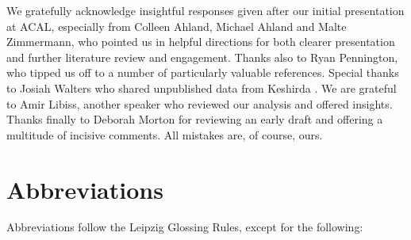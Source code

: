 \documentclass[output=paper,modfonts]{langscibook}
\begin{document}
We gratefully acknowledge insightful responses given after our initial presentation at ACAL, especially from Colleen Ahland, Michael Ahland and Malte Zimmermann, who pointed us in helpful directions for both clearer presentation and further literature review and engagement. Thanks also to Ryan Pennington, who tipped us off to a number of particularly valuable references. Special thanks to Josiah Walters who shared unpublished data from Keshirda . We are grateful to Amir Libiss, another  speaker who reviewed our analysis and offered insights. Thanks finally to Deborah Morton for reviewing an early draft and offering a multitude of incisive comments. All mistakes are, of course, ours.

\section*{Abbreviations}
Abbreviations follow the Leipzig Glossing Rules, except for the following:
\end{document}

